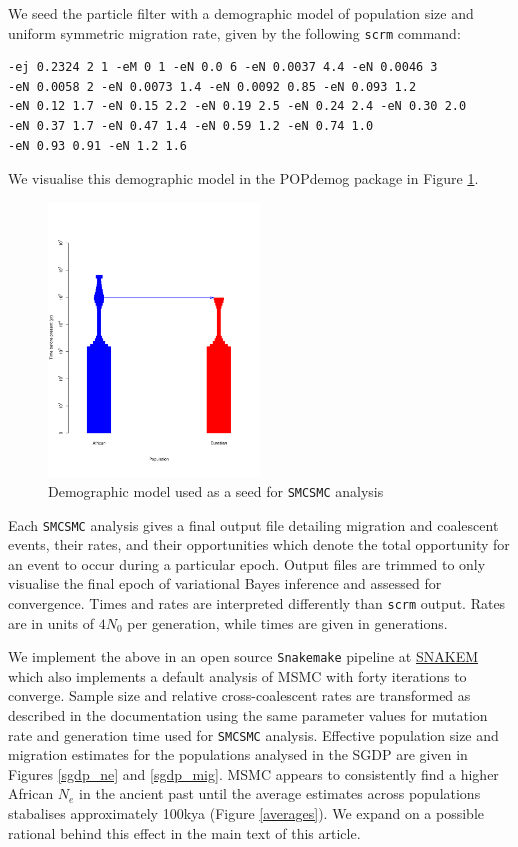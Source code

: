 \documentclass{article}
\begin{document}
We seed the particle filter with a demographic model of population size and uniform symmetric migration rate, given by the following {\tt scrm} command:

\begin{verbatim}
-ej 0.2324 2 1 -eM 0 1 -eN 0.0 6 -eN 0.0037 4.4 -eN 0.0046 3 
-eN 0.0058 2 -eN 0.0073 1.4 -eN 0.0092 0.85 -eN 0.093 1.2 
-eN 0.12 1.7 -eN 0.15 2.2 -eN 0.19 2.5 -eN 0.24 2.4 -eN 0.30 2.0 
-eN 0.37 1.7 -eN 0.47 1.4 -eN 0.59 1.2 -eN 0.74 1.0 
-eN 0.93 0.91 -eN 1.2 1.6
\end{verbatim}

We visualise this demographic model in the POPdemog package in Figure \ref{smc2demog}.

\begin{figure}[thb]
	\centering
	\includegraphics[width=0.5\textwidth]{plot/dem_smc2.pdf}
	\caption{Demographic model used as a seed for {\tt SMCSMC} analysis}
	\label{smc2demog}
\end{figure}

Each {\tt SMCSMC} analysis gives a final output file detailing migration and coalescent events, their rates, and their opportunities which denote the total opportunity for an event to occur during a particular epoch. Output files are trimmed to only visualise the final epoch of variational Bayes inference and assessed for convergence. Times and rates are interpreted differently than {\tt scrm} output. Rates are in units of $4N_0$ per generation, while times are given in generations. 

We implement the above in an open source {\tt Snakemake} pipeline at \url{SNAKEM} which also implements a default analysis of MSMC with forty iterations to converge. Sample size and relative cross-coalescent rates are transformed as described in the documentation using the same parameter values for mutation rate and generation time used for {\tt SMCSMC} analysis. Effective population size and migration estimates for the populations analysed in the SGDP are given in Figures \ref{sgdp_ne} and \ref{sgdp_mig}. MSMC appears to consistently find a higher African $N_e$ in the ancient past until the average estimates across populations stabalises approximately 100kya (Figure \ref{averages}). We expand on a possible rational behind this effect in the main text of this article.
\end{document}
